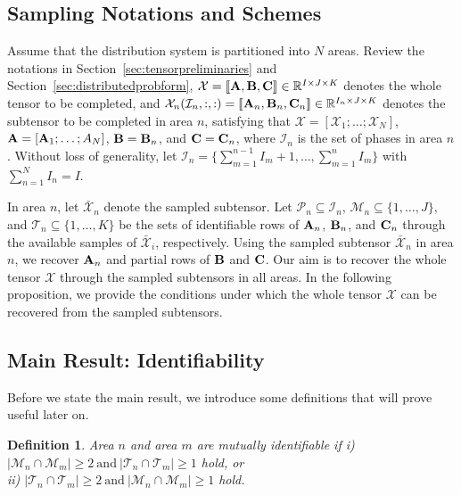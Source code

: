 \documentclass[journal]{IEEEtran}
\newcounter{define}
\newtheorem{definition}[define]{Definition}
\newcommand{\cpd}[3]{\llbracket #1, #2, #3 \rrbracket}
\newcommand{\A}{{\bf A}}
\newcommand{\B}{{\bf B}}
\newcommand{\C}{{\bf C}}
\newcommand{\Ten}[1]{\mathcal{#1}}
\begin{document}
\subsection{Sampling Notations and Schemes}
\label{subsect:samplingnotations}
\iffalse
First review the notations in Section~\ref{section:disADMM}. The distribution system is partitioned into $N$ areas and each area has $I_ni$ phases. The CPD of the original full tensor is $\Ten{X}= {\cpd{\A}{\B}{\C}}$, and the CPD of each subtensor is $\Ten{X}_n= {\cpd{\A_n}{\B_n}{\C_n}}$. 
\fi
Assume that the distribution system is partitioned into $N$ areas. Review the notations in Section~\ref{sec:tensorpreliminaries} and Section~\ref{sec:distributedprobform}, $\mathcal{X}={\cpd{\A}{\B}{\C}}\in\mathbb{R}^{I\times J\times K}$ denotes the whole tensor to be completed, and $\mathcal{X}_n(\mathcal{I}_n, :,:)={\cpd{\A_n}{\B_n}{\C_n}}\in\mathbb{R}^{I_n\times J\times K}$ denotes the subtensor to be completed in area $n$, satisfying that $\Ten{X} = [\Ten{X}_1; \ldots; \Ten{X}_N]$, $\A = [\A_1; \ldots; A_N]$, $\B=\B_n$, and $\C=\C_n$, where $\mathcal{I}_n$ is the set of phases in area $n$. Without loss of generality, let $\mathcal{I}_n=\{{\sum_{m=1}^{n-1}I_m+1,\ldots, \sum_{m=1}^{n}I_m}\}$ with $\sum_{n=1}^N I_n=I$.

In area $n$, let $\Ten{\bar{X}}_n$ denote the sampled subtensor. Let  $\mathcal{P}_n\subseteq \mathcal{I}_n$, $\mathcal{M}_n\subseteq\{1,\ldots, J\}$, and $\mathcal{T}_n\subseteq\{1,\ldots, K\}$ be the sets of identifiable rows of $\A_n$, $\B_n$, and $\C_n$ through the available samples of $\Ten{\bar{X}}_i$, respectively. Using  the sampled subtensor $\Ten{\bar{X}}_n$ in area $n$, we recover $\A_n$ and partial rows of $\B$ and $\C$. Our aim is to recover the whole tensor $\Ten{X}$ through the sampled subtensors in all areas. In the following proposition, we  provide the conditions under which the whole tensor $\mathcal{X}$ can be recovered from the sampled subtensors.

\subsection{Main Result: Identifiability}
Before we state the main result, we introduce some definitions that will prove useful later on.

\begin{definition}
Area $n$ and area $m$ are mutually identifiable if i) $|\mathcal{M}_n\cap \mathcal{M}_m|\geq 2 \ \text{and}\  |\mathcal{T}_n\cap \mathcal{T}_m|\geq 1$ hold, or \\
ii) $|\mathcal{T}_n\cap \mathcal{T}_m|\geq 2 \ \text{and}\  |\mathcal{M}_n\cap \mathcal{M}_m|\geq 1$ hold.
\end{definition}
\end{document}
